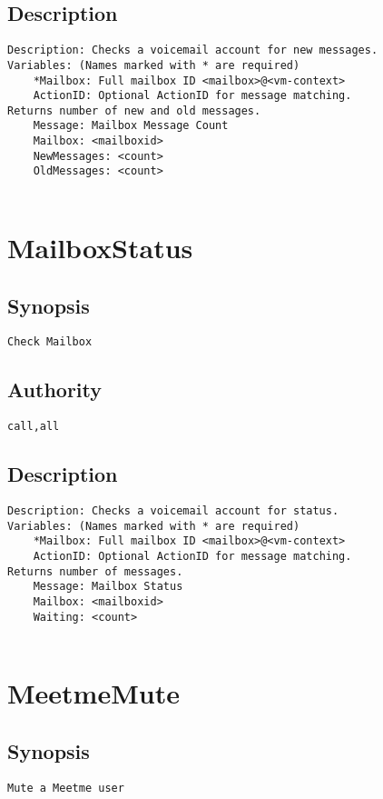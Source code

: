 \subsection{Description}
\begin{verbatim}
Description: Checks a voicemail account for new messages.
Variables: (Names marked with * are required)
	*Mailbox: Full mailbox ID <mailbox>@<vm-context>
	ActionID: Optional ActionID for message matching.
Returns number of new and old messages.
	Message: Mailbox Message Count
	Mailbox: <mailboxid>
	NewMessages: <count>
	OldMessages: <count>


\end{verbatim}


\section{MailboxStatus}
\subsection{Synopsis}
\begin{verbatim}
Check Mailbox
\end{verbatim}
\subsection{Authority}
\begin{verbatim}
call,all
\end{verbatim}
\subsection{Description}
\begin{verbatim}
Description: Checks a voicemail account for status.
Variables: (Names marked with * are required)
	*Mailbox: Full mailbox ID <mailbox>@<vm-context>
	ActionID: Optional ActionID for message matching.
Returns number of messages.
	Message: Mailbox Status
	Mailbox: <mailboxid>
	Waiting: <count>


\end{verbatim}


\section{MeetmeMute}
\subsection{Synopsis}
\begin{verbatim}
Mute a Meetme user
\end{verbatim}
